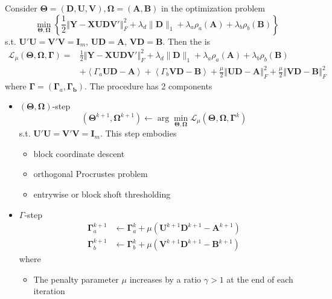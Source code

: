 \documentclass[twoside]{article}
\begin{document}
Consider $\boldsymbol{\Theta} = (\mathbf{D,U,V}),\boldsymbol{\Omega}=(\mathbf{A,B})$ in the optimization problem
$$
\min_{\boldsymbol{\Theta,\Omega}}\left\{ \frac{1}{2}\left\Vert \mathbf{Y-XUDV}' \right\Vert _F^2 + \lambda_d \lVert \mathbf{D} \rVert _1 + \lambda_a \rho_a (\mathbf{A}) + \lambda_b \rho_b (\mathbf{B})\right\}
$$
s.t. $\mathbf{U'U}=\mathbf{V'V}=\mathbf{I}_m$, $\mathbf{UD}=\mathbf{A}$, $\mathbf{VD}=\mathbf{B}$. Then the  is
\begin{align*}
    \mathcal{L}_{\mu}\left( \boldsymbol{\Theta,\Omega,\Gamma} \right) =& \frac{1}{2} \left\Vert \mathbf{Y-XUDV}' \right\Vert _F^2 + \lambda_d \lVert \mathbf{D} \rVert _1 + \lambda_a \rho_a (\mathbf{A}) + \lambda_b \rho_b (\mathbf{B}) \\
    & + \left< \Gamma_a \mathbf{UD-A} \right> + \left< \Gamma_b \mathbf{VD-B} \right> + \frac{\mu}{2}\left\Vert \mathbf{UD-A} \right\Vert^2_F + \frac{\mu}{2}\left\Vert \mathbf{VD-B} \right\Vert^2_F 
\end{align*}
where $\boldsymbol{\Gamma} = \left( \boldsymbol{\Gamma}_a,\boldsymbol{\Gamma_b} \right)$. The procedure has 2 components 
\begin{itemize}
    \item $(\boldsymbol{\Theta,\Omega})$-step $$ \left(\boldsymbol{\Theta}^{k+1},\boldsymbol{\Omega}^{k+1}\right) \leftarrow \arg \min_{\boldsymbol{\Theta,\Omega}} \mathcal{L}_\mu(\boldsymbol{\Theta,\Omega},\boldsymbol{\Gamma}^k) $$ s.t. $\mathbf{U'U=V'V=I}_m$. This step embodies 
    \begin{itemize}
        \item block coordinate descent 
        \item orthogonal Procrustes problem 
        \item entrywise or block shoft thresholding
    \end{itemize}
    \item $\Gamma$-step 
    \begin{align*}
        \boldsymbol{\Gamma}^{k+1}_a &\leftarrow \boldsymbol{\Gamma}^k_a + \mu \left( \mathbf{U}^{k+1}\mathbf{D}^{k+1}-\mathbf{A}^{k+1} \right)\\
        \boldsymbol{\Gamma}^{k+1}_b &\leftarrow \boldsymbol{\Gamma}^k_b + \mu \left( \mathbf{V}^{k+1}\mathbf{D}^{k+1}-\mathbf{B}^{k+1} \right)
    \end{align*}
    where
    \begin{itemize}
        \item The penalty parameter $\mu$ increases by a ratio $\gamma>1$ at the end of each iteration 
    \end{itemize}
\end{itemize}
\end{document}
